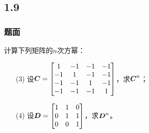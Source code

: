 \documentclass[9pt,xcolor=svgnames]{beamer} %
\begin{document}
\subsection*{1.9}
\begin{frame}
    \frametitle{题面}
    计算下列矩阵的\(n\)次方幂：
    \begin{enumerate}
        \item[(3)] 设\(\boldsymbol{C}=\begin{bmatrix}1&-1&-1&-1\\-1&1&-1&-1\\-1&-1&1&-1\\-1&-1&-1&1\end{bmatrix}\)，求\(\boldsymbol{C}^n\)；
        \item[(4)] 设\(\boldsymbol{D}=\begin{bmatrix}1&1&0\\0&1&1\\0&0&1\end{bmatrix}\)，求\(\boldsymbol{D}^n\)。
    \end{enumerate}
\end{frame}
\end{document}
